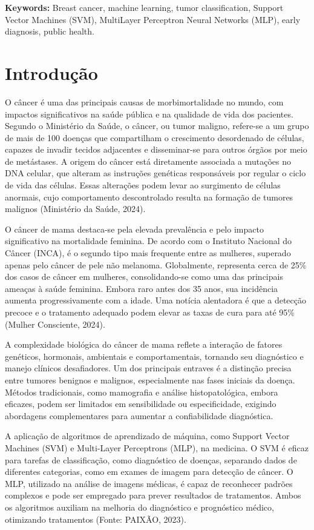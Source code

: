\documentclass[12pt,a4paper,oneside,openany]{article}
\begin{document}
\noindent\textbf{Keywords:} Breast cancer, machine learning, tumor classification, Support Vector Machines (SVM), MultiLayer Perceptron Neural Networks (MLP), early diagnosis, public health.


\section{Introdução}

O câncer é uma das principais causas de morbimortalidade no mundo, com impactos significativos na saúde pública e na qualidade de vida dos pacientes. Segundo o Ministério da Saúde, o câncer, ou tumor maligno, refere-se a um grupo de mais de 100 doenças que compartilham o crescimento desordenado de células, capazes de invadir tecidos adjacentes e disseminar-se para outros órgãos por meio de metástases. A origem do câncer está diretamente associada a mutações no DNA celular, que alteram as instruções genéticas responsáveis por regular o ciclo de vida das células. Essas alterações podem levar ao surgimento de células anormais, cujo comportamento descontrolado resulta na formação de tumores malignos (Ministério da Saúde, 2024).

\noindent O câncer de mama destaca-se pela elevada prevalência e pelo impacto significativo na mortalidade feminina. De acordo com o Instituto Nacional do Câncer (INCA), é o segundo tipo mais frequente entre as mulheres, superado apenas pelo câncer de pele não melanoma. Globalmente, representa cerca de 25\% dos casos de câncer em mulheres, consolidando-se como uma das principais ameaças à saúde feminina. Embora raro antes dos 35 anos, sua incidência aumenta progressivamente com a idade. Uma notícia alentadora é que a detecção precoce e o tratamento adequado podem elevar as taxas de cura para até 95\% (Mulher Consciente, 2024).

\noindent A complexidade biológica do câncer de mama reflete a interação de fatores genéticos, hormonais, ambientais e comportamentais, tornando seu diagnóstico e manejo clínicos desafiadores. Um dos principais entraves é a distinção precisa entre tumores benignos e malignos, especialmente nas fases iniciais da doença. Métodos tradicionais, como mamografia e análise histopatológica, embora eficazes, podem ser limitados em sensibilidade ou especificidade, exigindo abordagens complementares para aumentar a confiabilidade diagnóstica.

\noindent A aplicação de algoritmos de aprendizado de máquina, como Support Vector Machines (SVM) e Multi-Layer Perceptrons (MLP), na medicina. O SVM é eficaz para tarefas de classificação, como diagnóstico de doenças, separando dados de diferentes categorias, como em exames de imagem para detecção de câncer. O MLP, utilizado na análise de imagens médicas, é capaz de reconhecer padrões complexos e pode ser empregado para prever resultados de tratamentos. Ambos os algoritmos auxiliam na melhoria do diagnóstico e prognóstico médico, otimizando tratamentos (Fonte: PAIXÃO, 2023).
\end{document}
